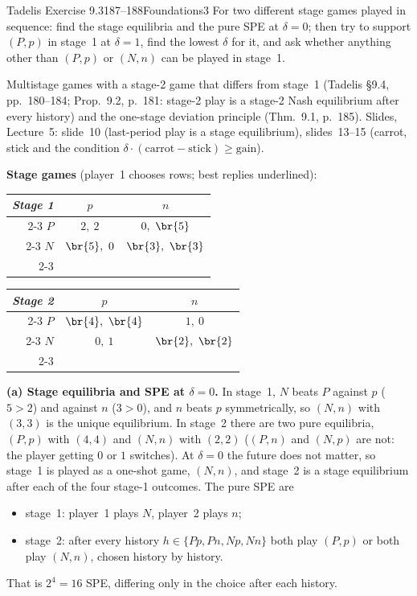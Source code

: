 \begin{exsol}{Tadelis Exercise 9.3}{187--188}{Foundations}{3}
\asked For two different stage games played in sequence: find the stage equilibria and the pure SPE at
$\delta = 0$; then try to support $(P,p)$ in stage~1 at $\delta = 1$, find the lowest $\delta$ for it, and
ask whether anything other than $(P,p)$ or $(N,n)$ can be played in stage~1.

\method Multistage games with a stage-2 game that differs from stage~1 (Tadelis \S9.4, pp.~180--184;
Prop.~9.2, p.~181: stage-2 play is a stage-2 Nash equilibrium after every history) and the
one-stage deviation principle (Thm.~9.1, p.~185). Slides, Lecture~5: slide~10 (last-period play is a
stage equilibrium), slides~13--15 (carrot, stick and the condition $\delta\cdot(\text{carrot} -
\text{stick}) \ge \text{gain}$).

\solution
\textbf{Stage games} (player~1 chooses rows; best replies underlined):
\begin{center}
\begin{tabular}{r|c|c|}
\multicolumn{1}{r}{\emph{Stage 1}} & \multicolumn{1}{c}{$p$} & \multicolumn{1}{c}{$n$}\\ \cline{2-3}
$P$ & $2,\ 2$ & $0,\ \br{5}$ \\ \cline{2-3}
$N$ & $\br{5},\ 0$ & $\br{3},\ \br{3}$ \\ \cline{2-3}
\end{tabular}
\qquad
\begin{tabular}{r|c|c|}
\multicolumn{1}{r}{\emph{Stage 2}} & \multicolumn{1}{c}{$p$} & \multicolumn{1}{c}{$n$}\\ \cline{2-3}
$P$ & $\br{4},\ \br{4}$ & $1,\ 0$ \\ \cline{2-3}
$N$ & $0,\ 1$ & $\br{2},\ \br{2}$ \\ \cline{2-3}
\end{tabular}
\end{center}

\textbf{(a) Stage equilibria and SPE at $\delta=0$.} In stage~1, $N$ beats $P$ against $p$ ($5>2$) and
against $n$ ($3>0$), and $n$ beats $p$ symmetrically, so $(N,n)$ with $(3,3)$ is the unique equilibrium. In
stage~2 there are two pure equilibria, $(P,p)$ with $(4,4)$ and $(N,n)$ with $(2,2)$ ($(P,n)$ and $(N,p)$
are not: the player getting $0$ or $1$ switches). At $\delta = 0$ the future does not matter, so stage~1
is played as a one-shot game, $(N,n)$, and stage~2 is a stage equilibrium after each of the four stage-1
outcomes. The pure SPE are
\begin{itemize}
  \item stage~1: player~1 plays $N$, player~2 plays $n$;
  \item stage~2: after every history $h \in \{Pp, Pn, Np, Nn\}$ both play $(P,p)$ or both play $(N,n)$,
  chosen history by history.
\end{itemize}
That is $2^4 = 16$ SPE, differing only in the choice after each history.


\end{exsol}
